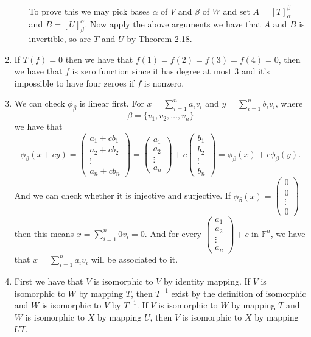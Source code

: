 \begin{enumerate}
\begin{enumerate}
To prove this we may pick bases $\alpha $ of $V$ and $\beta $ of $W$ and set $A=[T]_{\alpha }^{\beta }$ and $B=[U]_{\beta }^{\alpha }$. Now apply the above arguments we have that $A$ and $B$ is invertible, so are $T$ and $U$ by Theorem 2.18.
\end{enumerate}
\item If $T(f)=0$ then we have that $f(1)=f(2)=f(3)=f(4)=0$, then we have that $f$ is zero function since it has degree at most $3$ and it's impossible to have four zeroes if $f$ is nonzero.
\item We can check $\phi _{\beta }$ is linear first. For $x=\sum_{i=1}^n{a_iv_i}$ and $y=\sum_{i=1}^n{b_iv_i}$, where \[\beta=\{v_1,v_2,\ldots ,v_n\}\] we have that 
\[\phi_{\beta }(x+cy)=\left(\begin{array}{c}a_1+cb_1\\a_2+cb_2\\\vdots \\a_n+cb_n\end{array}\right)=\left(\begin{array}{c}a_1\\a_2\\\vdots \\a_n\end{array}\right)+c\left(\begin{array}{c}b_1\\b_2\\\vdots \\b_n\end{array}\right)=\phi_{\beta}(x)+c\phi_{\beta}(y).\]
And we can check whether it is injective and surjective. If $\phi_{\beta}(x)=\left(\begin{array}{c}0\\0\\\vdots \\0\end{array}\right)$ then this means $x=\sum_{i=1}^n{0v_i}=0$. And for every $\left(\begin{array}{c}a_1\\a_2\\\vdots \\a_n\end{array}\right)+c$ in $\mathbb{F}^n$, we have that $x=\sum_{i=1}^n{a_iv_i}$ will be associated to it.
\item First we have that $V$ is isomorphic to $V$ by identity mapping. If $V$ is isomorphic to $W$ by mapping $T$, then $T^{-1}$ exist by the definition of isomorphic and $W$ is isomorphic to $V$ by $T^{-1}$. If $V$ is isomorphic to $W$ by mapping $T$ and $W$ is isomorphic to $X$ by mapping $U$, then $V$ is isomorphic to $X$ by mapping $UT$.

\end{enumerate}
